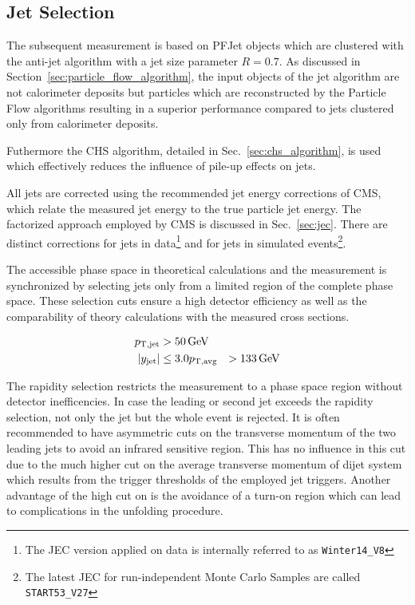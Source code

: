 \subsection{Jet Selection}

The subsequent measurement is based on PFJet objects which are clustered
with the anti-\kt jet algorithm with a jet size parameter $R=0.7$. As discussed in
Section~\ref{sec:particle_flow_algorithm}, the input objects of the jet algorithm are not
calorimeter deposits but particles which are reconstructed by the Particle Flow
algorithms resulting in a superior performance compared to jets clustered only from
calorimeter deposits. 

Futhermore the CHS algorithm, detailed in Sec.~\ref{sec:chs_algorithm}, is used which effectively
reduces the influence of pile-up effects on jets.

All jets are corrected using the recommended jet energy corrections of CMS,
which relate the measured jet energy to the true particle jet energy. The
factorized approach employed by CMS is discussed in Sec.~\ref{sec:jec}. There are
distinct corrections for jets in data\footnote{The JEC version applied on data
    is internally referred to as \texttt{Winter14\_V8}} and for jets in simulated
events\footnote{The latest JEC for run-independent Monte Carlo Samples are
    called \texttt{START53\_V27}}.


The accessible phase space in theoretical calculations and the measurement is
synchronized by selecting jets only from a limited region of the complete phase
space. These selection cuts ensure a high detector efficiency as well as the
comparability of theory calculations with the measured cross sections.

\begin{align*}
    \ptjet &> \SI{50}{\GeV}\\
    |y_\mathrm{jet}| &\leq 3.0
    \ptavg &> \SI{133}{\GeV}\\
\end{align*}

The rapidity selection restricts the measurement to a phase space region without
detector inefficencies. In case the leading or second jet exceeds the rapidity
selection, not only the jet but the whole event is rejected. It is often
recommended to have asymmetric cuts on the transverse momentum of the two
leading jets to avoid an infrared sensitive region. This has no influence in
this cut due to the much higher cut on the average transverse momentum of dijet
system which results from the trigger thresholds of the employed jet triggers.
Another advantage of the high cut on \ptavg is the avoidance of a turn-on region
which can lead to complications in the unfolding procedure.


